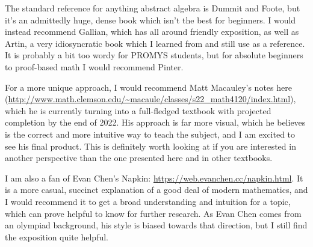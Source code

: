 \documentclass[letterpaper]{article}
\newtheorem{theorem}{Theorem}[section]
\theoremstyle{definition}
\theoremstyle{remark}
\newcommand\CC{\mathbb{C}}
\begin{document}
The standard reference for anything abstract algebra is Dummit and Foote, but it's an admittedly huge, dense book which isn't the best for beginners. I would instead recommend Gallian, which has all around friendly exposition, as well as Artin, a very idiosyncratic book which I learned from and still use as a reference. It is probably a bit too wordy for PROMYS students, but for absolute beginners to proof-based math I would recommend Pinter.

For a more unique approach, I would recommend Matt Macauley's notes here (\url{http://www.math.clemson.edu/~macaule/classes/s22_math4120/index.html}), which he is currently turning into a full-fledged textbook with projected completion by the end of 2022. His approach is far more visual, which he believes is the correct and more intuitive way to teach the subject, and I am excited to see his final product. This is definitely worth looking at if you are interested in another perspective than the one presented here and in other textbooks. 

I am also a fan of Evan Chen's Napkin: \url{https://web.evanchen.cc/napkin.html}. It is a more casual, succinct explanation of a good deal of modern mathematics, and I would recommend it to get a broad understanding and intuition for a topic, which can prove helpful to know for further research. As Evan Chen comes from an olympiad background, his style is biased towards that direction, but I still find the exposition quite helpful. 



\end{document}
